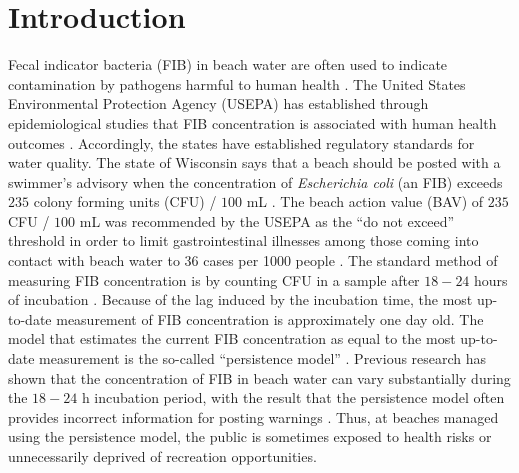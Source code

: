 \documentclass[authoryear,review, 12pt]{elsarticle}
\begin{document}
\section{Introduction}\label{introduction}

Fecal indicator bacteria (FIB) in beach water are often used to indicate
contamination by pathogens harmful to human health \citep{Cabelli:1979lb,Wade:2006qc,Wade:2008yi,Fleisher:2010xo}. The United States Environmental
Protection Agency (USEPA) has established through epidemiological
studies that FIB concentration is associated with human health outcomes
\citep{Cabelli:1983od,Dufour:1984yn,USEPA:ecs}. Accordingly, the 
states have established regulatory standards for water quality. The state of  
Wisconsin says that a beach should be posted with a swimmer's advisory
when the concentration of \emph{Escherichia coli} (an FIB) exceeds \(235\) colony forming units (CFU) / \(100\)
mL \citep{USEPA-2012,WDNR-2012}. The
beach action value (BAV) of \(235\) CFU / \(100\) mL
was recommended by the USEPA as the ``do not exceed'' threshold in order
to limit gastrointestinal illnesses among those coming into contact with
beach water to 36 cases per 1000 people \citep{USEPA-2012}. The standard method of measuring FIB concentration is by counting CFU in a sample after \(18-24\) hours of incubation \citep{Colilert}. 
Because of the lag induced by the incubation time, the most up-to-date measurement of FIB concentration 
is approximately one day old. The model that estimates the current FIB concentration as equal to the most up-to-date measurement is the so-called
``persistence model'' \citep{USEPA:2007lj}. Previous
research has shown that the concentration of FIB in beach water can vary
substantially during the \(18-24\) h incubation period, with the result
that the persistence model often provides incorrect information for
posting warnings \citep{Whitman:2004wv,Whitman:2008nb}. Thus, at
beaches managed using the persistence model, the public is sometimes
exposed to health risks or unnecessarily deprived of recreation
opportunities.
\end{document}
